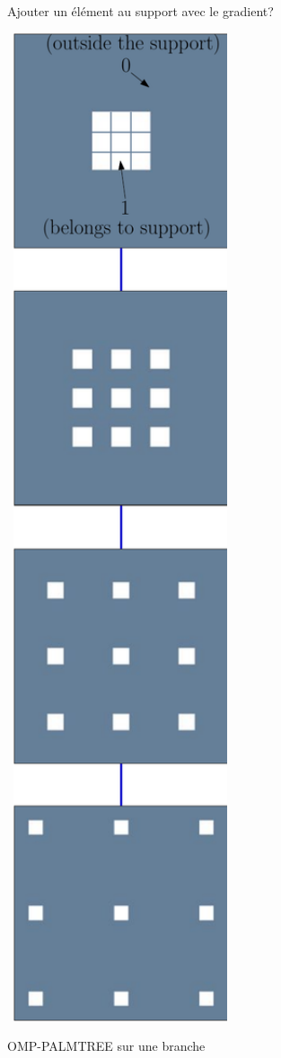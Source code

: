 \begin{frame}{Ajouter un élément au support avec le gradient?}
\end{frame}
\includegraphics[width=0.5\textwidth]{figures/check-gradient/tree_classic.pdf}
\begin{frame}{OMP-PALMTREE sur une branche}
\end{frame}


